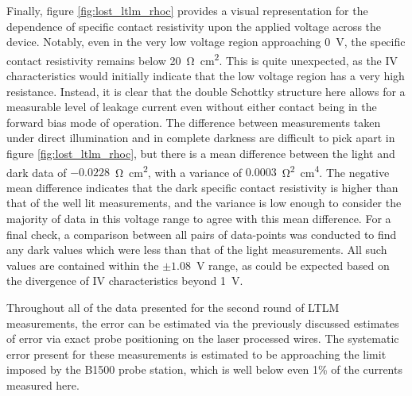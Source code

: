 \begin{refsection}
Finally, figure \ref{fig:lost_ltlm_rhoc} provides a visual representation for the dependence of specific contact resistivity upon the applied voltage across the device. Notably, even in the very low voltage region approaching 0~\si{\volt}, the specific contact resistivity remains below 20~\si{\ohm\centi\metre\squared}. This is quite unexpected, as the IV characteristics would initially indicate that the low voltage region has a very high resistance. Instead, it is clear that the double Schottky structure here allows for a measurable level of leakage current even without either contact being in the forward bias mode of operation. The difference between measurements taken under direct illumination and in complete darkness are difficult to pick apart in figure \ref{fig:lost_ltlm_rhoc}, but there is a mean difference between the light and dark data of $-0.0228$~\si{\ohm\centi\metre\squared}, with a variance of $0.0003$~\si{\ohm\squared\centi\metre\tothe{4}}. The negative mean difference indicates that the dark specific contact resistivity is higher than that of the well lit measurements, and the variance is low enough to consider the majority of data in this voltage range to agree with this mean difference. For a final check, a comparison between all pairs of data-points was conducted to find any dark values which were less than that of the light measurements. All such values are contained within the $\pm1.08$~\si{\volt} range, as could be expected based on the divergence of IV characteristics beyond 1~\si{\volt}.

Throughout all of the data presented for the second round of LTLM measurements, the error can be estimated via the previously discussed estimates of error via exact probe positioning on the laser processed wires. The systematic error present for these measurements is estimated to be approaching the limit imposed by the B1500 probe station, which is well below even 1\% of the currents measured here.

\printbibliography[heading=subbibliography]

\end{refsection}